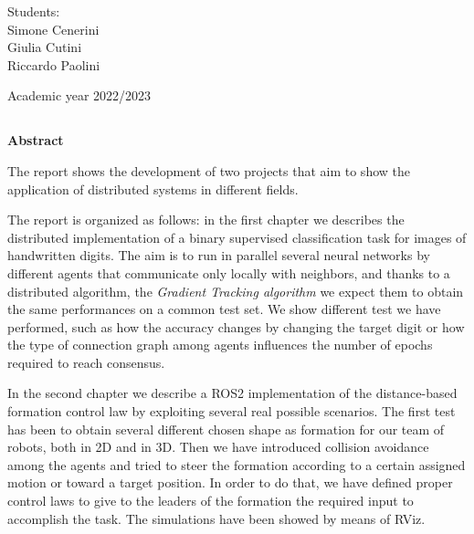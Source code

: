 \documentclass[a4paper,11pt,oneside]{book}
\begin{document}
\begin{flushright}
      {\large Students:}\\
      {Simone Cenerini} \\
      {Giulia Cutini} \\
      {Riccardo Paolini} \\
\end{flushright}        %
\begin{center}
\vfill
      {\large Academic year \@2022/2023} \\
\end{center}



\newpage
\thispagestyle{empty}

\begin{center}
\chapter*{}
\thispagestyle{empty}
{\Huge \textbf{Abstract}}\\
\vspace{15mm}
\end{center}

The report shows the development of two projects that aim to show the application of distributed systems in different fields.

\bigskip
The report is organized as follows: in the first chapter we describes the distributed implementation of a binary supervised classification task for images of handwritten digits. The aim is to run in parallel several neural networks by different agents that communicate only locally with neighbors, and thanks to a distributed algorithm, the \textit{Gradient Tracking algorithm} we expect them to obtain the same performances on a common test set. We show different test we have performed, such as how the accuracy changes by changing the target digit or how the type of connection graph among agents influences the number of epochs required to reach consensus.

\bigskip
In the second chapter we describe a ROS2 implementation of the distance-based formation control law by exploiting several real possible scenarios. The first test has been to obtain several different chosen shape as formation for our team of robots, both in 2D and in 3D. 
Then we have introduced collision avoidance among the agents and tried to steer the formation according to a certain assigned motion or toward a target position. In order to do that, we have defined proper control laws to give to the leaders of the formation the required input to accomplish the task.
The simulations have been showed by means of RViz.
\end{document}

